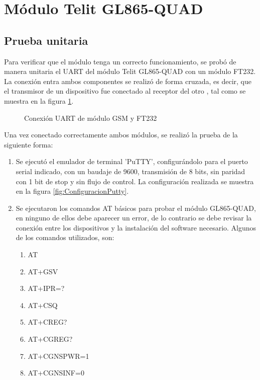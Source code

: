 \section{Módulo Telit GL865-QUAD}
\subsection{Prueba unitaria}
Para verificar que el módulo tenga un correcto funcionamiento, se probó de manera unitaria el UART del módulo Telit GL865-QUAD con un módulo FT232. La conexión entra ambos componentes se realizó de forma cruzada, es decir, que el transmisor de un dispositivo fue conectado al receptor del otro , tal como se muestra en la figura \ref{fig:ConexionUART}.

	\begin{figure}[htbp!]
		\centering
		\caption{Conexión UART de módulo GSM y FT232}
		\label{fig:ConexionUART}
	\end{figure}
	
Una vez conectado correctamente ambos módulos, se realizó la prueba de la siguiente forma:
\begin{enumerate}
	\item Se ejecutó el emulador de terminal ’PuTTY’, configurándolo para el puerto serial
	indicado, con un baudaje de 9600, transmisión de 8 bits, sin paridad con 1 bit de
	stop y sin flujo de control. La configuración realizada se muestra en la figura \ref{fig:ConfiguracionPutty}.
	\item Se ejecutaron los comandos AT básicos para probar el módulo GL865-QUAD, en ninguno de ellos
	debe aparecer un error, de lo contrario se debe revisar la conexión entre los dispositivos
	y la instalación del software necesario. Algunos de los comandos utilizados, son:
		\begin{enumerate}
			\item AT
			\item AT+GSV
			\item AT+IPR=?
			\item AT+CSQ
			\item AT+CREG? 
			\item AT+CGREG? 
			\item AT+CGNSPWR=1
			\item AT+CGNSINF=0
		\end{enumerate}	
\end{enumerate}
 
